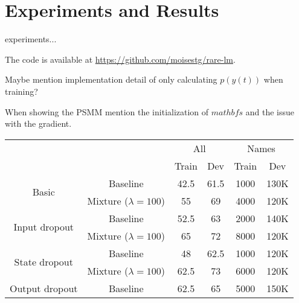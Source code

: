 \chapter{Experiments and Results}

experiments... 

The code is available at \url{https://github.com/moisestg/rare-lm}.

Maybe mention implementation detail of only calculating $p(y(t))$ when training?

When showing the PSMM mention the initialization of $mathbf{s}$ and the issue with the gradient.

\begin{table}[]
	\centering
	\begin{tabular}{cc|c|c|c|c|}
		\cline{3-6}
		\multicolumn{1}{l}{}                                                    & \multicolumn{1}{l|}{}   & \multicolumn{2}{c|}{All} & \multicolumn{2}{c|}{Names} \\ \cline{3-6} 
		&                         & Train       & Dev        & Train        & Dev         \\ \hline
		\multicolumn{1}{|c|}{\multirow{2}{*}{Basic}}                            & Baseline                & 42.5        & 61.5       & 1000         & 130K        \\ \cline{2-6} 
		\multicolumn{1}{|c|}{}                                                  & Mixture ($\lambda=100$) & 55          & 69         & 4000         & 120K        \\ \hline
		\multicolumn{1}{|c|}{\multirow{2}{*}{Input dropout}}                    & Baseline                & 52.5        & 63         & 2000         & 140K        \\ \cline{2-6} 
		\multicolumn{1}{|c|}{}                                                  & Mixture ($\lambda=100$) & 65          & 72         & 8000         & 120K        \\ \hline
		\multicolumn{1}{|c|}{\multirow{2}{*}{State dropout}}                    & Baseline                & 48          & 62.5       & 1000         & 120K        \\ \cline{2-6} 
		\multicolumn{1}{|c|}{}                                                  & Mixture ($\lambda=100$) & 62.5        & 73         & 6000         & 120K        \\ \hline
		\multicolumn{1}{|c|}{\multirow{2}{*}{Output dropout}}                   & Baseline                & 62.5        & 65         & 5000         & 150K        \\ \cline{2-6} 

\end{tabular}
\end{table}
